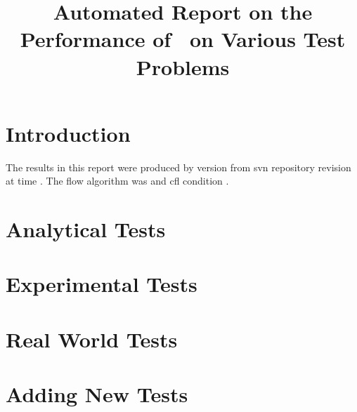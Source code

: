 \documentclass[11pt,a4paper]{report}
\begin{document}
 

\title{Automated Report on the Performance of \anuga ~on Various Test Problems}
\maketitle
\tableofcontents

\chapter{Introduction}

The results in this report were produced by \anuga{} version \majorR{} 
from svn repository revision \minorR{} at time \timeR.
The flow algorithm was \alg{} and cfl condition \cfl.

\chapter{Analytical Tests}








\chapter{Experimental Tests}


\chapter{Real World Tests}


\appendix
\chapter{Adding New Tests}
\end{document}
